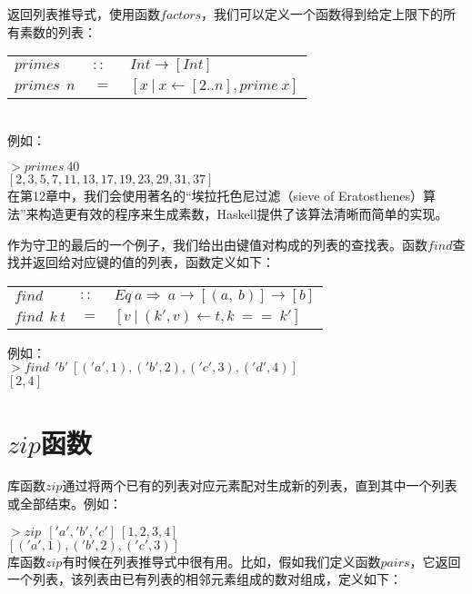 返回列表推导式，使用函数$factors$，我们可以定义一个函数得到给定上限下的所有素数的列表：


\begin{tabular}[t]{lll}
  $primes$&$~::~$&$Int\rightarrow [Int]$\\
  $primes~~n$&$~=~$&$[x~|~x \leftarrow[2..n],prime~x]$\\
\end{tabular}\\

\noindent 例如：

\noindent\hspace*{1cm}$>primes~40$\\
\hspace*{1cm}$[2,3,5,7,11,13,17,19,23,29,31,37]$\\

在第12章中，我们会使用著名的“埃拉托色尼过滤（sieve of Eratosthenes）算法”来构造更有效的程序来生成素数，Haskell提供了该算法清晰而简单的实现。

作为守卫的最后的一个例子，我们给出由键值对构成的列表的查找表。函数$find$查找并返回给对应键的值的列表，函数定义如下：

\begin{tabular}[t]{lll}
  $find$&$::$&$Eq~a\Rightarrow ~a\rightarrow[(a,~b)]\rightarrow [b]$\\
  $find~~k~t$&$=$&$[v~|~(k', v) \leftarrow t, k~==~k']$
\end{tabular}

\noindent 例如：\\
\noindent\hspace*{1cm}$>find~~'b'~[('a', 1),('b', 2),('c', 3),('d',4)]$\\
\hspace*{1cm}$[2,4]$\\

\section{$zip$函数}
库函数$zip$通过将两个已有的列表对应元素配对生成新的列表，直到其中一个列表或全部结束。例如：

\noindent\hspace{1cm}$>zip~~['a','b','c']~[1,2,3,4]$\\
\hspace*{1cm}$[('a',1),('b',2),('c',3)]$\\

库函数$zip$有时候在列表推导式中很有用。比如，假如我们定义函数$pairs$，它返回一个列表，该列表由已有列表的相邻元素组成的数对组成，定义如下：\\

